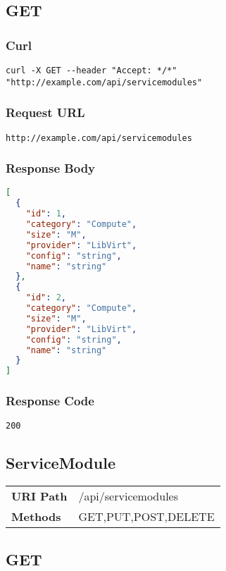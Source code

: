 \subsection{GET}
\subsubsection{Curl}
\begin{lstlisting}[] 
  curl -X GET --header "Accept: */*" "http://example.com/api/servicemodules"
\end{lstlisting}


\subsubsection{Request URL}
\begin{lstlisting}[] 
http://example.com/api/servicemodules
\end{lstlisting}

\subsubsection{Response Body}
\begin{lstlisting}[language=json] 
[
  {
    "id": 1,
    "category": "Compute",
    "size": "M",
    "provider": "LibVirt",
    "config": "string",
    "name": "string"
  },
  {
    "id": 2,
    "category": "Compute",
    "size": "M",
    "provider": "LibVirt",
    "config": "string",
    "name": "string"
  }
]
\end{lstlisting}

\subsubsection{Response Code}
\begin{lstlisting}[] 
  200
\end{lstlisting}

\subsection{ServiceModule}
\begin{tabularx}{\linewidth}{l l}
\textbf{URI Path} & /api/servicemodules\\
\textbf{Methods} & GET,PUT,POST,DELETE\\
\end{tabularx}

\subsection{GET}
